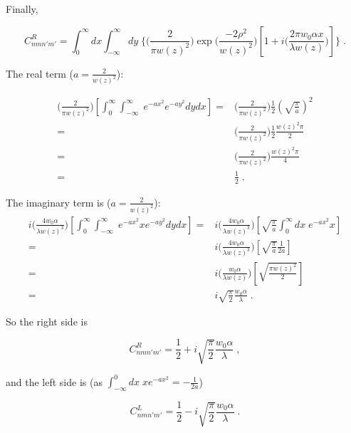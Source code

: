 \documentclass[aps,twoside,secnumarabic,balancelastpage,amsmath,amssymb,nofootinbib,hyperref=pdftex]{revtex4}
\newcommand{\bigfrac}[2]{\Big( \frac{#1}{#2}\Big)}
\begin{document}
Finally,

\begin{equation}
C_{nmn'm'}^{R} = \int_{0}^{\infty} dx\int_{-\infty}^{\infty}  dy \;
\lbrace
	\bigfrac{2}{\pi w(z)^2}
	\exp \bigfrac{-2 \rho^2}{w(z)^{2}}	
	\left[
		1 
		+ 
		i  \bigfrac{ 2 \pi w_{0} \alpha x}{\lambda w(z)}		
	\right]
\rbrace
\;.
\end{equation}	

The real term ($a = \frac{2}{w(z)^2}$):

\begin{align*}
\bigfrac{2}{\pi w(z)^2}
\left[
\int_{0}^{\infty} \int_{-\infty}^{\infty}  \; e^{-a x^2} e^{-a y^2} dydx \right]
=&
 \bigfrac{2}{\pi w(z)^2}
 \frac{1}{2} (\sqrt{\frac{\pi}{a} })^2
 \\=& 
 \bigfrac{2}{\pi w(z)^2}\frac{1}{2}{\frac{w(z)^2 \pi}{2} }
 \\=&
 \bigfrac{2}{\pi w(z)^2}\frac{w(z)^2 { \pi}}{4} 
 \\=& \frac{1}{2}
\;.
\end{align*}

The imaginary term is ($a = \frac{2}{w(z)^2}$):
\begin{align*}
i  \bigfrac{ 4 w_{0} \alpha}{\lambda w(z)^3}
		\left[
		\int_{0}^{\infty} \int_{-\infty}^{\infty}  \; e^{-a x^2}x e^{-a y^2} dydx \right]
=&
i  \bigfrac{ 4 w_{0} \alpha}{\lambda w(z)^3}
\left[
\sqrt{\frac{\pi}{a}}
\int_{0}^{\infty} dx\; e^{-a x^2}x
\right]
\\=&
i  \bigfrac{ 4 w_{0} \alpha}{\lambda w(z)^3}
\left[
	\sqrt{\frac{\pi}{a}}
	\frac{1}{2a}
\right]
\\=&
i  \bigfrac{ w_{0} \alpha}{\lambda w(z)}
\left[
	\sqrt{\frac{\pi w(z)^2}{2}}
\right]
\\=&
i  \sqrt{\frac{\pi}{2}}
\frac{ w_{0} \alpha}{\lambda}	
\;.
\end{align*}

So the right side is

\begin{equation}
	C_{nmn'm'}^{R} =
		\frac{1}{2}
		+
		i  \sqrt{\frac{\pi}{2}}
		\frac{ w_{0} \alpha}{\lambda}
\;,
\end{equation}

and the left side is (as $\int_{-\infty}^{0}dx \; xe^{-ax^2} = -\frac{1}{2a}$)

\begin{equation}
	C_{nmn'm'}^{L} =
		\frac{1}{2}
		-
		i  \sqrt{\frac{\pi}{2}}
		\frac{ w_{0} \alpha}{\lambda}
\;.
\end{equation}
\end{document}
